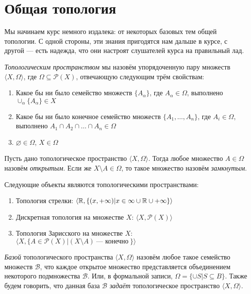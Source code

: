 \section{Общая топология}

Мы начинаем курс немного издалека: от некоторых базовых тем общей топологии.
С одной стороны, эти знания пригодятся нам дальше в курсе, с другой --- есть 
надежда, что они настроят слушателей курса на правильный лад.

\begin{definition} \emph{Топологическим пространством} мы назовём упорядоченную
пару множеств $\langle X, \Omega \rangle$, где $\Omega \subseteq {\mathcal{P}}(X)$,
отвечающую следующим трём свойствам:

\begin{enumerate}
\item Какое бы ни было семейство множеств $\{A_\alpha\}$, где $A_\alpha \in \Omega$, выполнено
$\cup_\alpha\{A_\alpha\} \in X$
\item Какое бы ни было конечное семейство множеств $\{A_1, \dots, A_n\}$, где $A_i \in \Omega$,
выполнено $A_1 \cap A_2 \cap \dots \cap A_n \in \Omega$
\item $\varnothing \in \Omega$, $X \in \Omega$
\end{enumerate}
\end{definition}

\begin{definition} Пусть дано топологическое пространство $\langle X, \Omega \rangle$.
Тогда любое множество $A \in \Omega$ назовём \emph{открытым}. Если же $X \setminus A \in \Omega$, 
то такое множество назовём \emph{замкнутым}.
\end{definition}

\begin{theorem} Следующие объекты являются топологическими пространствами:
\begin{enumerate}
\item Топология стрелки: $\langle \mathbb{R}, \{(x,+\infty) | x \in {\-\infty}\cup\mathbb{R}\cup{+\infty}\} \rangle$
\item Дискретная топология на множестве $X$: $\langle X, {\mathcal{P}}(X) \rangle$
\item Топология Зарисского на множестве $X$: $\langle X, \{ A \in {\mathcal{P}}(X) | (X \setminus A) ~\textrm{--- конечно}~\} \rangle$
\end{enumerate}
\end{theorem}

\begin{definition} \emph{Базой} топологического пространства $\langle X, \Omega \rangle$ назовём
любое такое семейство множеств $\mathcal{B}$, что каждое открытое множество представляется
объединением некоторого подмножества $\mathcal{B}$. Или, в формальной записи,
$\Omega = \{\cup S | S \subseteq B\}$.
Также будем говорить, что данная база $\mathcal{B}$ \emph{задаёт} топологическое 
пространство $\langle X, \Omega \rangle$.
\end{definition}

